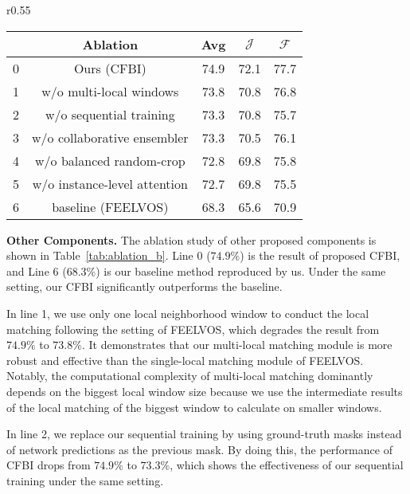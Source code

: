 \documentclass[runningheads]{llncs}
\begin{document}
\setlength{\intextsep}{-3pt}
\begin{wraptable}[11]{r}{0.55\textwidth}

\centering
\caption{Ablation of other components.}\label{tab:ablation_b}
\begin{tabular}{l c c c c}
    \toprule[1.5pt]
          & Ablation & Avg & $\mathcal{J}$ & $\mathcal{F}$ \\
    \midrule[1pt]
        0  & Ours (CFBI) & 74.9 & 72.1 & 77.7 \\
    \hline
        1  & w/o multi-local windows & 73.8 & 70.8 & 76.8 \\
        2  & w/o sequential training & 73.3 & 70.8 & 75.7 \\
        3  & w/o collaborative ensembler & 73.3 & 70.5 & 76.1 \\
4  & w/o balanced random-crop & 72.8 & 69.8 & 75.8 \\
        5  & w/o instance-level attention & 72.7 & 69.8 & 75.5 \\
\hline
        6  & baseline (FEELVOS) & 68.3 & 65.6 & 70.9 \\
    \bottomrule[1.5pt]
\end{tabular}
\end{wraptable}

\noindent \textbf{Other Components.} The ablation study of other proposed components is shown in Table~\ref{tab:ablation_b}. Line 0 ($74.9\%$) is the result of proposed CFBI, and Line 6 ($68.3\%$) is our baseline method reproduced by us. Under the same setting, our CFBI significantly outperforms the baseline.



In line 1, we use only one local neighborhood window to conduct the local matching following the setting of FEELVOS, which degrades the result from $74.9\%$ to $73.8\%$. It demonstrates that our multi-local matching module is more robust and effective than the single-local matching module of FEELVOS. Notably, the computational complexity of multi-local matching dominantly depends on the biggest local window size because we use the intermediate results of the local matching of the biggest window to calculate on smaller windows.



In line 2, we replace our sequential training by using ground-truth masks instead of network predictions as the previous mask. By doing this, the performance of CFBI drops from $74.9\%$ to $73.3\%$, which shows the effectiveness of our sequential training under the same setting.
\end{document}
